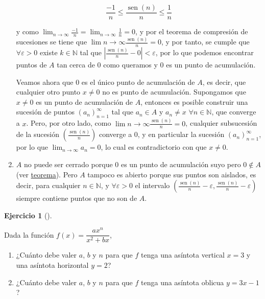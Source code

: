 \documentclass[
  spanish,
  a4paper,
]{scrreport}
\providecommand{\tightlist}{%
  \setlength{\itemsep}{0pt}\setlength{\parskip}{0pt}}
\theoremstyle{definition}
\newtheorem{exercise}{Ejercicio}[chapter]
\theoremstyle{remark}
\begin{document}
\begin{tcolorbox}
\begin{enumerate}
  \[
  \frac{-1}{n}\leq \frac{\operatorname{sen}(n)}{n}\leq \frac{1}{n}
  \]

  y como
  \(\lim_{n\to\infty} \frac{-1}{n}=\lim_{n\to\infty} \frac{1}{n} = 0\),
  y por el teorema de compresión de sucesiones se tiene que
  \(\lim{n\to \infty}\frac{\operatorname{sen}(n)}{n} = 0\), y por tanto,
  se cumple que \(\forall \varepsilon>0\) existe \(k\in\mathbb{N}\) tal
  que
  \(\left|\frac{\operatorname{sen}(n)}{n} - 0 \right| < \varepsilon\),
  por lo que podemos encontrar puntos de \(A\) tan cerca de \(0\) como
  queramos y \(0\) es un punto de acumulación.

  Veamos ahora que \(0\) es el único punto de acumulación de \(A\), es
  decir, que cualquier otro punto \(x\neq 0\) no es punto de
  acumulación. Supongamos que \(x\neq 0\) es un punto de acumulación de
  \(A\), entonces es posible construir una sucesión de puntos
  \((a_n)_{n=1}^\infty\) tal que \(a_n\in A\) y \(a_n\neq x\)
  \(\forall n\in \mathbb{N}\), que converge a \(x\). Pero, por otro
  lado, como \(\lim{n\to \infty}\frac{\operatorname{sen}(n)}{n} = 0\),
  cualquier subsucesión de la sucesión
  \(\left(\frac{\operatorname{sen}(n)}{n}\right)\) converge a \(0\), y
  en particular la sucesión \((a_n)_{n=1}^\infty\), por lo que
  \(\lim_{n\to\infty} a_n = 0\), lo cual es contradictorio con que
  \(x\neq 0\).
\item
  \(A\) no puede ser cerrado porque \(0\) es un punto de acumulación
  suyo pero \(0\not\in A\) (ver
  \href{https://aprendeconalf.es/analisis-manual/03-topologia-reales.html\#thm-conjunto-cerrado-puntos-acumulacion}{teorema}).
  Pero \(A\) tampoco es abierto porque sus puntos son aislados, es
  decir, para cualquier \(n\in\mathbb{N}\), y \(\forall \varepsilon>0\)
  el intervalo
  \(\left(\frac{\operatorname{sen}(n)}{n}-\varepsilon, \frac{\operatorname{sen}(n)}{n}-\varepsilon\right)\)
  siempre contiene puntos que no son de \(A\).
\end{enumerate}

\end{tcolorbox}

\begin{exercise}[]\protect\hypertarget{exr-4}{}\label{exr-4}

Dada la función \(f(x)=\dfrac{ax^n}{x^2+bx}\),

\begin{enumerate}
\def\labelenumi{\alph{enumi}.}
\tightlist
\item
  ¿Cuánto debe valer \(a\), \(b\) y \(n\) para que \(f\) tenga una
  asíntota vertical \(x=3\) y una asíntota horizontal \(y=2\)?
\item
  ¿Cuánto debe valer \(a\), \(b\) y \(n\) para que \(f\) tenga una
  asíntota oblicua \(y=3x-1\)?
\end{enumerate}

\end{exercise}
\end{document}

